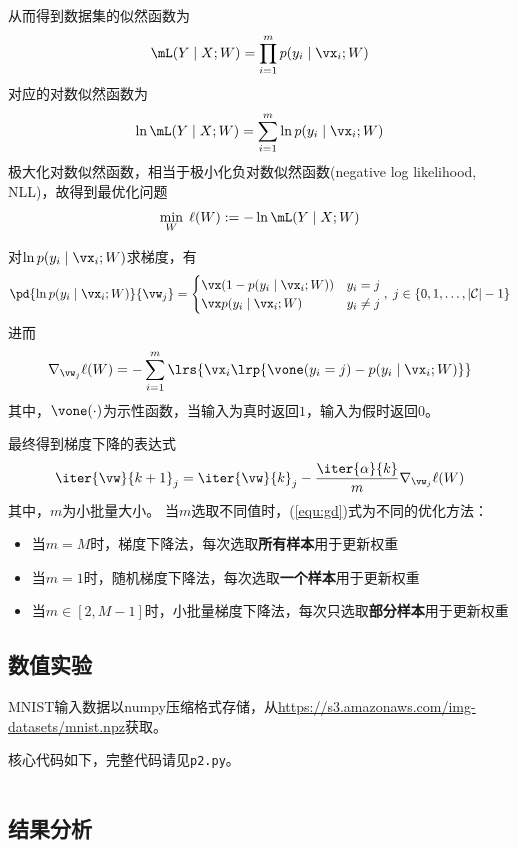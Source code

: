 \documentclass[logo,reportComp]{thesis}
\begin{document}
从而得到数据集的似然函数为
\[\mL(Y\mid X;W)=\prod_{i=1}^m p(y_i\mid\vx_i;W)\]
对应的对数似然函数为
\[\ln\mL(Y\mid X;W)=\sum_{i=1}^m\ln p(y_i\mid\vx_i;W)\]
极大化对数似然函数，相当于极小化负对数似然函数(negative log likelihood, NLL)，故得到最优化问题
\begin{equation}
\min_W \;\ell(W):=-\ln\mL(Y\mid X;W)
\end{equation}

对$\ln p(y_i\mid\vx_i;W)$求梯度，有
\[\pd{\ln p(y_i\mid\vx_i;W)}{\vw_j}=
\begin{cases}
\vx(1-p(y_i\mid\vx_i;W)) & y_i=j\\
\vx p(y_i\mid\vx_i;W) & y_i\ne j
\end{cases},\;j\in\{0,1,\ldots,|\mathcal{C}|-1\}\]
进而
\begin{equation}
\nabla_{\vw_j}\ell(W)=-\sum_{i=1}^m\lrs{\vx_i\lrp{\vone(y_i=j)-p(y_i\mid\vx_i;W)}}
\end{equation}
其中，$\vone(\cdot)$为示性函数，当输入为真时返回$1$，输入为假时返回$0$。

最终得到梯度下降的表达式
\begin{equation}
\label{equ:gd}
\iter{\vw}{k+1}_j=\iter{\vw}{k}_j-\frac{\iter{\alpha}{k}}{m}\nabla_{\vw_j}\ell(W)
\end{equation}
其中，$m$为小批量大小。
当$m$选取不同值时，(\ref{equ:gd})式为不同的优化方法：
\begin{itemize}
\item 当$m=M$时，梯度下降法，每次选取\textbf{所有样本}用于更新权重
\item 当$m=1$时，随机梯度下降法，每次选取\textbf{一个样本}用于更新权重
\item 当$m\in[2,M-1]$时，小批量梯度下降法，每次只选取\textbf{部分样本}用于更新权重
\end{itemize}

\subsection{数值实验}
MNIST输入数据以numpy压缩格式存储，从\url{https://s3.amazonaws.com/img-datasets/mnist.npz}获取。

核心代码如下，完整代码请见\verb'p2.py'。
\begin{lstlisting}
\end{lstlisting}

\subsection{结果分析}


\end{document}
